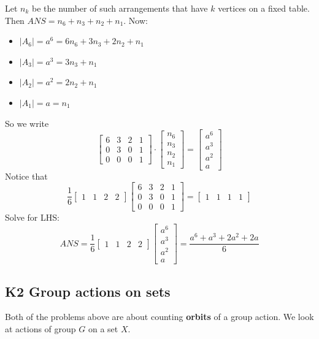 \documentclass[12pt]{article}
\begin{document}
Let $n_k$ be the number of such arrangements that have $k$ vertices on a fixed table. Then $ANS=n_6+n_3+n_2+n_1$. Now: \begin{itemize}
    \item $|A_6|=a^6=6n_6+3n_3+2n_2+n_1$
    \item $|A_3|=a^3=3n_3+n_1$
    \item $|A_2|=a^2=2n_2+n_1$
    \item $|A_1|=a=n_1$
\end{itemize}
So we write \[\begin{bmatrix}
    6&3&2&1\\0&3&0&1\\0&0&0&1
\end{bmatrix}\cdot \begin{bmatrix}
    n_6\\n_3\\n_2\\n_1
\end{bmatrix} = \begin{bmatrix}
    a^6\\a^3\\a^2\\a
\end{bmatrix}\]
Notice that \[\frac{1}{6}\begin{bmatrix}
    1&1&2&2
\end{bmatrix}\begin{bmatrix}
    6&3&2&1\\0&3&0&1\\0&0&0&1
\end{bmatrix} =  \begin{bmatrix}
    1&1&1&1
\end{bmatrix}\]
Solve for LHS: \[ANS = \frac{1}{6}\begin{bmatrix}
    1&1&2&2
\end{bmatrix}\begin{bmatrix}
    a^6\\a^3\\a^2\\a
\end{bmatrix} = \frac{a^6+a^3+2a^2+2a}{6}\]

\subsection{K2 Group actions on sets}
Both of the problems above are about counting \textbf{orbits} of a group action. We look at actions of group $G$ on a set $X$. 
\end{document}
